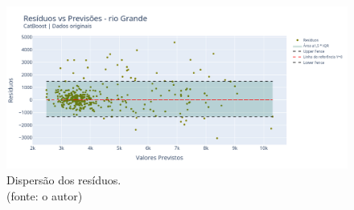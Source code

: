 %
%
%
%
%
%
%

\begin{figure}[!h]
\centering
\includegraphics[scale=0.33]{Figuras/rio_grande/wfv/CB/CB_WFV_ORIG_RESID_x_PREV.png}
\caption{Dispersão dos resíduos.\\(fonte: o autor)}
\label{fig:grande_CB_WFV_ORIG_RESID_x_PREV}
\end{figure}

